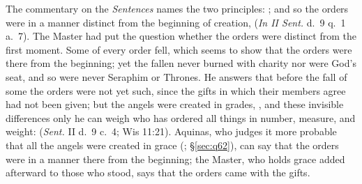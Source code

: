 The commentary on the \emph{Sentences} names the two principles:
; and so
the orders were in a manner distinct from the beginning of creation,
 (\emph{In II Sent.} d.~9
q.~1 a.~7). The Master had put the question whether the orders were
distinct from the first moment. Some of every order fell, which seems to
show that the orders were there from the beginning; yet the fallen never
burned with charity nor were God's seat, and so were never Seraphim or
Thrones. He answers that before the fall of some the orders were not yet
such, since the gifts in which their members agree had not been given; but
the angels were created in grades, , and these invisible
differences only he can weigh who has ordered all things in number, measure,
and weight: 
(\emph{Sent.} II d.~9 c.~4; Wis 11:21). Aquinas, who judges it more probable
that all the angels were created in grace (;
\S\ref{sec:q62}), can say that the orders were in a manner there from the beginning;
the Master, who holds grace added afterward to those who stood, says that
the orders came with the gifts.

